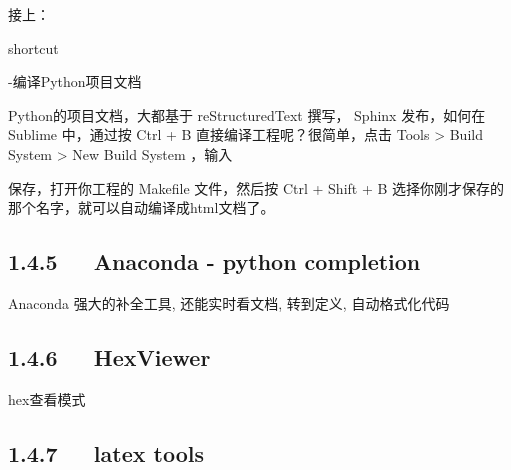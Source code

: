 \documentclass[letterpaper,12pt,english]{sphinxmanual}
\begin{document}
接上：

shortcut

     
  

-编译Python项目文档

Python的项目文档，大都基于 reStructuredText 撰写， Sphinx 发布，如何在
Sublime 中，通过按 Ctrl + B 直接编译工程呢？很简单，点击 Tools \textendash{}\textgreater{} Build
System \textendash{}\textgreater{} New Build System ，输入

\begin{sphinxVerbatim}[commandchars=\\\{\}]
     
\end{sphinxVerbatim}

保存，打开你工程的 Makefile 文件，然后按 Ctrl + Shift + B
选择你刚才保存的那个名字，就可以自动编译成html文档了。


\subsection{1.4.5   Anaconda - python completion}
\label{\detokenize{001software/001install/sublime:anaconda-python-completion}}
Anaconda 强大的补全工具, 还能实时看文档, 转到定义, 自动格式化代码




\subsection{1.4.6   HexViewer}
\label{\detokenize{001software/001install/sublime:hexviewer}}
hex查看模式


\subsection{1.4.7   latex tools}
\label{\detokenize{001software/001install/sublime:latex-tools}}
\end{document}
